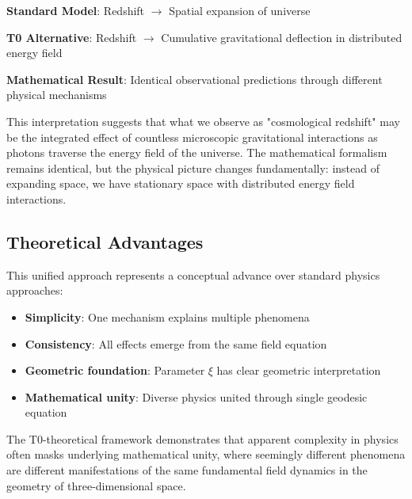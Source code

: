 \documentclass[12pt,a4paper]{article}
\theoremstyle{definition}
\begin{document}
	\begin{tcolorbox}[colback=green!5!white,colframe=green!75!black,title=Alternative Cosmological Model]
		\textbf{Standard Model}: Redshift $\rightarrow$ Spatial expansion of universe
		
		\textbf{T0 Alternative}: Redshift $\rightarrow$ Cumulative gravitational deflection in distributed energy field
		
		\textbf{Mathematical Result}: Identical observational predictions through different physical mechanisms
	\end{tcolorbox}
	
	This interpretation suggests that what we observe as "cosmological redshift" may be the integrated effect of countless microscopic gravitational interactions as photons traverse the energy field of the universe. The mathematical formalism remains identical, but the physical picture changes fundamentally: instead of expanding space, we have stationary space with distributed energy field interactions.
	
	\subsection{Theoretical Advantages}
	
	This unified approach represents a conceptual advance over standard physics approaches:
	
	\begin{itemize}
		\item \textbf{Simplicity}: One mechanism explains multiple phenomena
		\item \textbf{Consistency}: All effects emerge from the same field equation
		\item \textbf{Geometric foundation}: Parameter $\xi$ has clear geometric interpretation
		\item \textbf{Mathematical unity}: Diverse physics united through single geodesic equation
	\end{itemize}
	
	The T0-theoretical framework demonstrates that apparent complexity in physics often masks underlying mathematical unity, where seemingly different phenomena are different manifestations of the same fundamental field dynamics in the geometry of three-dimensional space.
	
\end{document}
